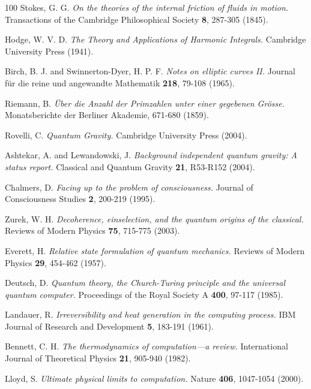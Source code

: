\documentclass[11pt]{article}
\theoremstyle{definition}
\begin{document}
\begin{thebibliography}{100}
Stokes, G. G.
\textit{On the theories of the internal friction of fluids in motion.}
Transactions of the Cambridge Philosophical Society \textbf{8}, 287-305 (1845).

Hodge, W. V. D.
\textit{The Theory and Applications of Harmonic Integrals.}
Cambridge University Press (1941).

Birch, B. J. and Swinnerton-Dyer, H. P. F.
\textit{Notes on elliptic curves II.}
Journal für die reine und angewandte Mathematik \textbf{218}, 79-108 (1965).

Riemann, B.
\textit{Über die Anzahl der Primzahlen unter einer gegebenen Grösse.}
Monatsberichte der Berliner Akademie, 671-680 (1859).


Rovelli, C.
\textit{Quantum Gravity.}
Cambridge University Press (2004).

Ashtekar, A. and Lewandowski, J.
\textit{Background independent quantum gravity: A status report.}
Classical and Quantum Gravity \textbf{21}, R53-R152 (2004).

Chalmers, D.
\textit{Facing up to the problem of consciousness.}
Journal of Consciousness Studies \textbf{2}, 200-219 (1995).

Zurek, W. H.
\textit{Decoherence, einselection, and the quantum origins of the classical.}
Reviews of Modern Physics \textbf{75}, 715-775 (2003).

Everett, H.
\textit{Relative state formulation of quantum mechanics.}
Reviews of Modern Physics \textbf{29}, 454-462 (1957).

Deutsch, D.
\textit{Quantum theory, the Church-Turing principle and the universal quantum computer.}
Proceedings of the Royal Society A \textbf{400}, 97-117 (1985).

Landauer, R.
\textit{Irreversibility and heat generation in the computing process.}
IBM Journal of Research and Development \textbf{5}, 183-191 (1961).

Bennett, C. H.
\textit{The thermodynamics of computation—a review.}
International Journal of Theoretical Physics \textbf{21}, 905-940 (1982).

Lloyd, S.
\textit{Ultimate physical limits to computation.}
Nature \textbf{406}, 1047-1054 (2000).


\end{thebibliography}
\end{document}
